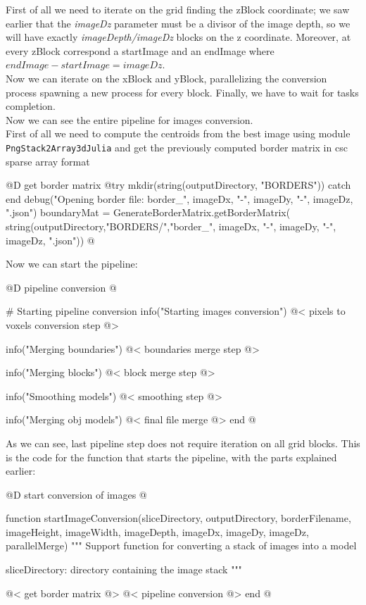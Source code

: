 \documentclass[11pt,oneside]{article}	%
\begin{document}
First of all we need to iterate on the grid finding the zBlock coordinate; we saw earlier that the \textit{imageDz} parameter must be a divisor of the image depth, so we will have exactly \textit{imageDepth/imageDz} blocks on the z coordinate. Moreover, at every zBlock correspond a startImage and an endImage where $endImage - startImage = imageDz$.\\
Now we can iterate on the xBlock and yBlock, parallelizing the conversion process spawning a new process for every block. Finally, we have to wait for tasks completion.\\

Now we can see the entire pipeline for images conversion.\\

First of all we need to compute the centroids from the best image using module \texttt{PngStack2Array3dJulia} and get the previously computed border matrix in csc sparse array format

@D get border matrix
@{try
  mkdir(string(outputDirectory, "BORDERS"))
catch
end
debug("Opening border file: border_", imageDx, "-", imageDy, "-", imageDz, ".json")
boundaryMat = GenerateBorderMatrix.getBorderMatrix(
					string(outputDirectory,"BORDERS/","border_",
					imageDx, "-", imageDy, "-", imageDz, ".json"))
@}

Now we can start the pipeline:

@D pipeline conversion
@{# Starting pipeline conversion
info("Starting images conversion")
@< pixels to voxels conversion step @>

info("Merging boundaries")
@< boundaries merge step @>
		
info("Merging blocks")
@< block merge step @>

info("Smoothing models")
@< smoothing step @>

info("Merging obj models")
@< final file merge @>
end @}

As we can see, last pipeline step does not require iteration on all grid blocks. This is the code for the function that starts the pipeline, with the parts explained earlier: 

@D start conversion of images
@{function startImageConversion(sliceDirectory, outputDirectory, borderFilename,
                              imageHeight, imageWidth, imageDepth,
                              imageDx, imageDy, imageDz,
                              parallelMerge)
  """
  Support function for converting a stack of images into a model

  sliceDirectory: directory containing the image stack
  """

  @< get border matrix @>
  @< pipeline conversion @>  
end
@}
\end{document}
